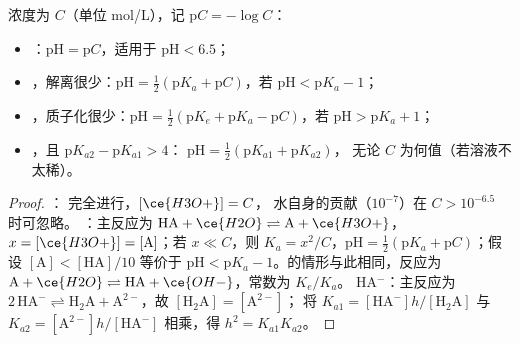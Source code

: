 \begin{proposition}[简单溶液的 pH]\label{prop:b1:predominant-reaction:ph-formulas}
浓度为 $C$（单位 \unit{mol/L}），记 $\mathrm{p}C = -\log C$：
\begin{itemize}
  \item {}：$\mathrm{pH} = \mathrm{p}C$，适用于
        $\mathrm{pH} < 6.5$；
  \item {}，解离很少：$\mathrm{pH} = \frac12(\mathrm{p}K_a
        + \mathrm{p}C)$，若 $\mathrm{pH} < \mathrm{p}K_a - 1$；
  \item {}，质子化很少：$\mathrm{pH} = \frac12(\mathrm{p}K_e +
        \mathrm{p}K_a - \mathrm{p}C)$，若 $\mathrm{pH} > \mathrm{p}K_a +
        1$；
  \item {}，且 $\mathrm{p}K_{a2} - \mathrm{p}K_{a1} > 4$：
        $\mathrm{pH} = \frac12(\mathrm{p}K_{a1} + \mathrm{p}K_{a2})$，
        无论 $C$ 为何值（若溶液不太稀）。
\end{itemize}
\end{proposition}

\begin{proof}
： 完全进行，$[\ce{H3O+}] = C$，
水自身的贡献（$10^{-7}$）在 $C > 10^{-6.5}$ 时可忽略。
：主反应为 $\mathrm{HA} + \ce{H2O}
\rightleftharpoons \mathrm{A} + \ce{H3O+}$， $x = [\ce{H3O+}]
= [\mathrm{A}]$；若 $x \ll C$，则 $K_a = x^2/C$，$\mathrm{pH} = \frac12(\mathrm{p}K_a
+ \mathrm{p}C)$；假设 $[\mathrm{A}] < [\mathrm{HA}]/10$
等价于 $\mathrm{pH} < \mathrm{p}K_a - 1$。的情形与此相同，反应为 $\mathrm{A} +
\ce{H2O} \rightleftharpoons \mathrm{HA} + \ce{OH-}$，常数为 $K_e/K_a$。
 HA$^-$：主反应为 $2\,\mathrm{HA}^- \rightleftharpoons
\mathrm{H_2A} + \mathrm{A}^{2-}$，故 $[\mathrm{H_2A}] = [\mathrm{A}^{2-}]$；
将 $K_{a1} = [\mathrm{HA}^-]h/[\mathrm{H_2A}]$ 与 $K_{a2} =
[\mathrm{A}^{2-}]h/[\mathrm{HA}^-]$ 相乘，得 $h^2 = K_{a1}K_{a2}$。
\end{proof}

